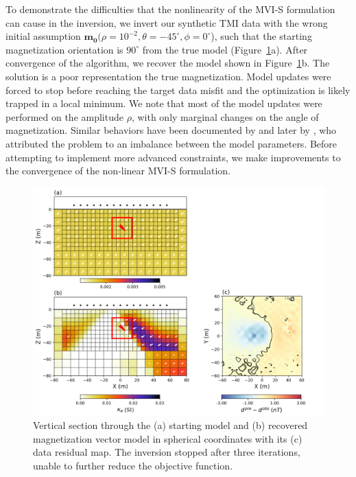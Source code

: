 \documentclass[paper]{geophysics}
\begin{document}
To demonstrate the difficulties that the nonlinearity of the MVI-S formulation can cause in the inversion, we invert our synthetic TMI data with the wrong initial assumption $\mathbf{m_0}(\rho=10^{-2}, \theta=-45^{\circ}, \phi=0^{\circ}$), such that the starting magnetization orientation is  $90^\circ$ from the true model (Figure~\ref{MVI_S_model_noScale}a). After convergence of the algorithm, we recover the model shown in Figure~\ref{MVI_S_model_noScale}b. The solution is a poor representation the true magnetization. Model updates were forced to stop before reaching the target data misfit and the optimization is likely trapped in a local minimum. We note that most of the model updates were performed on the amplitude $\rho$, with only marginal changes on the angle of magnetization. Similar behaviors have been documented by \cite{LelievreOldenburg2009} and later by \cite{Liu2017}, who attributed  the problem to an imbalance between the model parameters. Before attempting to implement more advanced constraints, we make improvements to the convergence of the non-linear MVI-S formulation.

\begin{figure}[p!]
\includegraphics[width=\columnwidth]{Figures/Figure4.png}
\caption{ Vertical section through the (a) starting model and (b) recovered magnetization vector model in spherical coordinates with its (c) data residual map. The inversion stopped after three iterations, unable to further reduce the objective function.}
\label{MVI_S_model_noScale}
\end{figure}
\end{document}
